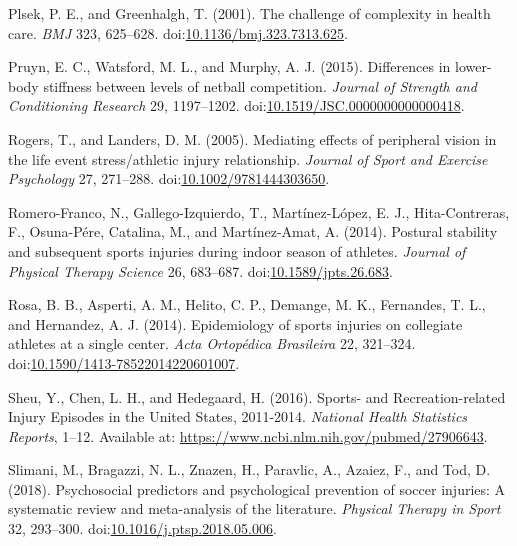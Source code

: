 \documentclass[utf8]{frontiersHLTH}
\begin{document}
\leavevmode\hypertarget{ref-Plsek2001}{}%
Plsek, P. E., and Greenhalgh, T. (2001). The challenge of complexity in
health care. \emph{BMJ} 323, 625--628.
doi:\href{https://doi.org/10.1136/bmj.323.7313.625}{10.1136/bmj.323.7313.625}.

\leavevmode\hypertarget{ref-Pruyn2015}{}%
Pruyn, E. C., Watsford, M. L., and Murphy, A. J. (2015). Differences in
lower-body stiffness between levels of netball competition.
\emph{Journal of Strength and Conditioning Research} 29, 1197--1202.
doi:\href{https://doi.org/10.1519/JSC.0000000000000418}{10.1519/JSC.0000000000000418}.

\leavevmode\hypertarget{ref-Rogers2005}{}%
Rogers, T., and Landers, D. M. (2005). Mediating effects of peripheral
vision in the life event stress/athletic injury relationship.
\emph{Journal of Sport and Exercise Psychology} 27, 271--288.
doi:\href{https://doi.org/10.1002/9781444303650}{10.1002/9781444303650}.

\leavevmode\hypertarget{ref-Romero-Franco2014}{}%
Romero-Franco, N., Gallego-Izquierdo, T., Martínez-López, E. J.,
Hita-Contreras, F., Osuna-Pére, Catalina, M., and Martínez-Amat, A.
(2014). Postural stability and subsequent sports injuries during indoor
season of athletes. \emph{Journal of Physical Therapy Science} 26,
683--687.
doi:\href{https://doi.org/10.1589/jpts.26.683}{10.1589/jpts.26.683}.

\leavevmode\hypertarget{ref-Rosa2014}{}%
Rosa, B. B., Asperti, A. M., Helito, C. P., Demange, M. K., Fernandes,
T. L., and Hernandez, A. J. (2014). Epidemiology of sports injuries on
collegiate athletes at a single center. \emph{Acta Ortopédica
Brasileira} 22, 321--324.
doi:\href{https://doi.org/10.1590/1413-78522014220601007}{10.1590/1413-78522014220601007}.

\leavevmode\hypertarget{ref-Sheu2016}{}%
Sheu, Y., Chen, L. H., and Hedegaard, H. (2016). Sports- and
Recreation-related Injury Episodes in the United States, 2011-2014.
\emph{National Health Statistics Reports}, 1--12. Available at:
\url{https://www.ncbi.nlm.nih.gov/pubmed/27906643}.

\leavevmode\hypertarget{ref-Slimani2018}{}%
Slimani, M., Bragazzi, N. L., Znazen, H., Paravlic, A., Azaiez, F., and
Tod, D. (2018). Psychosocial predictors and psychological prevention of
soccer injuries: A systematic review and meta-analysis of the
literature. \emph{Physical Therapy in Sport} 32, 293--300.
doi:\href{https://doi.org/10.1016/j.ptsp.2018.05.006}{10.1016/j.ptsp.2018.05.006}.
\end{document}
